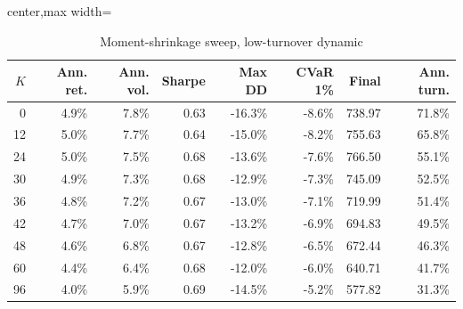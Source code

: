 \begin{table}[!htbp]
\centering
\caption{Moment-shrinkage sweep, low-turnover dynamic}
\label{tab:allocation-moment-shrinkage-low-turnover}
\small
\setlength{\tabcolsep}{5pt}
\renewcommand{\arraystretch}{1.12}
\begin{adjustbox}{center,max width=\linewidth}
\begin{tabular}{rrrrrrrr}
\toprule
$K$ & Ann. ret. & Ann. vol. & Sharpe & Max DD & CVaR 1\% & Final & Ann. turn. \\
\midrule
0 & 4.9\% & 7.8\% & 0.63 & -16.3\% & -8.6\% & 738.97 & 71.8\% \\
12 & 5.0\% & 7.7\% & 0.64 & -15.0\% & -8.2\% & 755.63 & 65.8\% \\
24 & 5.0\% & 7.5\% & 0.68 & -13.6\% & -7.6\% & 766.50 & 55.1\% \\
30 & 4.9\% & 7.3\% & 0.68 & -12.9\% & -7.3\% & 745.09 & 52.5\% \\
36 & 4.8\% & 7.2\% & 0.67 & -13.0\% & -7.1\% & 719.99 & 51.4\% \\
42 & 4.7\% & 7.0\% & 0.67 & -13.2\% & -6.9\% & 694.83 & 49.5\% \\
48 & 4.6\% & 6.8\% & 0.67 & -12.8\% & -6.5\% & 672.44 & 46.3\% \\
60 & 4.4\% & 6.4\% & 0.68 & -12.0\% & -6.0\% & 640.71 & 41.7\% \\
96 & 4.0\% & 5.9\% & 0.69 & -14.5\% & -5.2\% & 577.82 & 31.3\% \\
\bottomrule
\end{tabular}
\end{adjustbox}
\end{table}
